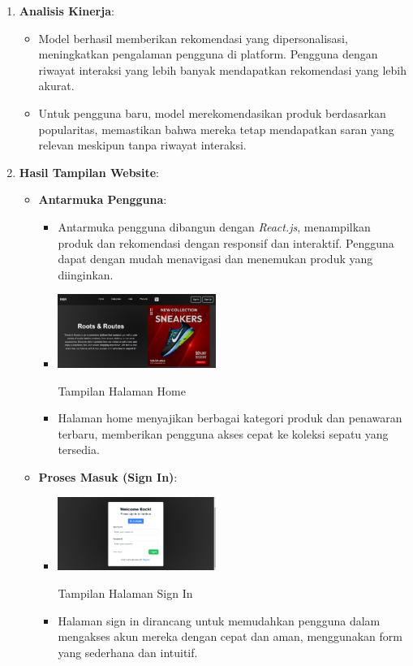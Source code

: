 \documentclass[journal,article,submit,pdftex,moreauthors]{Definitions/mdpi}
\begin{document}
\begin{enumerate}
    \item \textbf{Analisis Kinerja}:
    \begin{itemize}
        \item Model berhasil memberikan rekomendasi yang dipersonalisasi, meningkatkan pengalaman pengguna di platform. Pengguna dengan riwayat interaksi yang lebih banyak mendapatkan rekomendasi yang lebih akurat.
        \item Untuk pengguna baru, model merekomendasikan produk berdasarkan popularitas, memastikan bahwa mereka tetap mendapatkan saran yang relevan meskipun tanpa riwayat interaksi.
    \end{itemize}



\item \textbf{Hasil Tampilan Website}:
\begin{itemize}
    \item \textbf{Antarmuka Pengguna}:
    \begin{itemize}
        \item Antarmuka pengguna dibangun dengan \textit{React.js}, menampilkan produk dan rekomendasi dengan responsif dan interaktif. Pengguna dapat dengan mudah menavigasi dan menemukan produk yang diinginkan.
        \item \includegraphics[width=0.45\textwidth]{images/web1.png}
        \caption{Tampilan Halaman Home}
        \item Halaman home menyajikan berbagai kategori produk dan penawaran terbaru, memberikan pengguna akses cepat ke koleksi sepatu yang tersedia.
    \end{itemize}

    \item \textbf{Proses Masuk (Sign In)}:
    \begin{itemize}
        \item \includegraphics[width=0.45\textwidth]{images/web2.png}
        \caption{Tampilan Halaman Sign In}
        \item Halaman sign in dirancang untuk memudahkan pengguna dalam mengakses akun mereka dengan cepat dan aman, menggunakan form yang sederhana dan intuitif.
    \end{itemize}


\end{itemize}
\end{enumerate}
\end{document}
